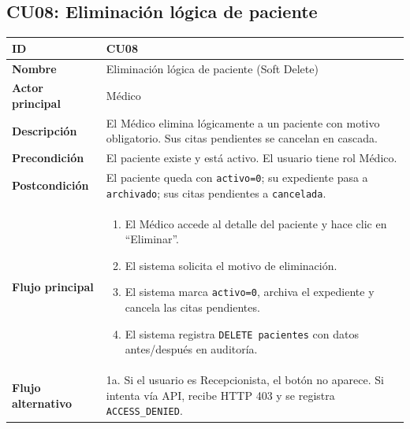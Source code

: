 \documentclass[11pt,a4paper]{article}
\begin{document}
\subsection*{CU08: Eliminación lógica de paciente}
\begin{longtable}{|L{3.5cm}|L{10cm}|}
    \hline
    \textbf{ID}                & CU08                                                                                                                                \\ \hline
    \textbf{Nombre}            & Eliminación lógica de paciente (Soft Delete)                                                                                        \\ \hline
    \textbf{Actor principal}   & Médico                                                                                                                              \\ \hline
    \textbf{Descripción}       & El Médico elimina lógicamente a un paciente con motivo obligatorio. Sus citas pendientes se cancelan en cascada.                    \\ \hline
    \textbf{Precondición}      & El paciente existe y está activo. El usuario tiene rol Médico.                                                                      \\ \hline
    \textbf{Postcondición}     & El paciente queda con \texttt{activo=0}; su expediente pasa a \texttt{archivado}; sus citas pendientes a \texttt{cancelada}.        \\ \hline
    \textbf{Flujo principal}   &
    \begin{enumerate}
        \item El Médico accede al detalle del paciente y hace clic en ``Eliminar''.
        \item El sistema solicita el motivo de eliminación.
        \item El sistema marca \texttt{activo=0}, archiva el expediente y cancela las citas pendientes.
        \item El sistema registra \texttt{DELETE pacientes} con datos antes/después en auditoría.
    \end{enumerate}                                                               \\ \hline
    \textbf{Flujo alternativo} & 1a. Si el usuario es Recepcionista, el botón no aparece. Si intenta vía API, recibe HTTP 403 y se registra \texttt{ACCESS\_DENIED}. \\ \hline
\end{longtable}
\end{document}
